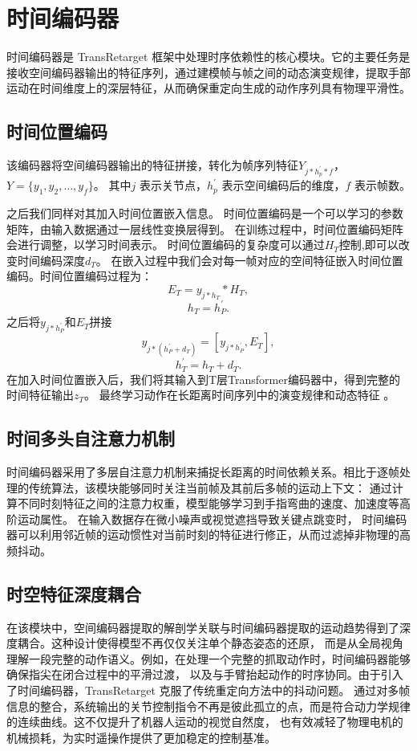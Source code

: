 \section{时间编码器}
时间编码器是 TransRetarget 框架中处理时序依赖性的核心模块。它的主要任务是接收空间编码器输出的特征序列，通过建模帧与帧之间的动态演变规律，提取手部运动在时间维度上的深层特征，从而确保重定向生成的动作序列具有物理平滑性。
\subsection{时间位置编码}
该编码器将空间编码器输出的特征拼接，转化为帧序列特征$Y_{j*h^{'}_{p}*f}$，
$Y = \{y_1, y_2, \ldots, y_f\}$。
其中$j$ 表示关节点，$h^{'}_{p}$ 表示空间编码后的维度，$f$ 表示帧数。

之后我们同样对其加入时间位置嵌入信息。
时间位置编码是一个可以学习的参数矩阵，由输入数据通过一层线性变换层得到。
在训练过程中，时间位置编码矩阵会进行调整，以学习时间表示。
时间位置编码的复杂度可以通过$H_{T}$控制,即可以改变时间编码深度$d_{T}$。
在嵌入过程中我们会对每一帧对应的空间特征嵌入时间位置编码。时间位置编码过程为：
\begin{equation}
  E_{T} = y_{j*h_{T}} * H_{T},
\end{equation}
\begin{equation}
h_{T} = h^{'}_{P}.
\end{equation}
之后将$y_{j*h^{'}_{P}}$和$E_{T}$拼接
\begin{equation}
y_{j*(h^{'}_{P}+d_{T})} = [y_{j*h^{'}_{P}} , E_{T}],
\end{equation}
\begin{equation}
h^{'}_{T} = h_{T}+d_{T}.
\end{equation}
在加入时间位置嵌入后，我们将其输入到T层Transformer编码器中，得到完整的时间特征输出$z_{T}$。
最终学习动作在长距离时间序列中的演变规律和动态特征 。
\subsection{时间多头自注意力机制}
时间编码器采用了多层自注意力机制来捕捉长距离的时间依赖关系。相比于逐帧处理的传统算法，该模块能够同时关注当前帧及其前后多帧的运动上下文：
通过计算不同时刻特征之间的注意力权重，模型能够学习到手指弯曲的速度、加速度等高阶运动属性。
在输入数据存在微小噪声或视觉遮挡导致关键点跳变时，
时间编码器可以利用邻近帧的运动惯性对当前时刻的特征进行修正，从而过滤掉非物理的高频抖动。
\subsection{时空特征深度耦合}
在该模块中，空间编码器提取的解剖学关联与时间编码器提取的运动趋势得到了深度耦合。这种设计使得模型不再仅仅关注单个静态姿态的还原，
而是从全局视角理解一段完整的动作语义。例如，在处理一个完整的抓取动作时，时间编码器能够确保指尖在闭合过程中的平滑过渡，
以及与手臂抬起动作的时序协同。由于引入了时间编码器，TransRetarget 克服了传统重定向方法中的抖动问题。
通过对多帧信息的整合，系统输出的关节控制指令不再是彼此孤立的点，而是符合动力学规律的连续曲线。这不仅提升了机器人运动的视觉自然度，
也有效减轻了物理电机的机械损耗，为实时遥操作提供了更加稳定的控制基准。

